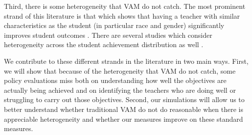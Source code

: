 \documentclass[letterpaper,12pt]{article}
\begin{document}
Third, there is some heterogeneity that VAM do not catch. The most prominent strand of this literature is that which shows that having a teacher with similar characteristics as the student (in particular race and gender) significantly improves student outcomes \citep{dee2005teacher, ehrenberg1995teachers}. There are several studies which consider heterogeneity across the student achievement distribution as well \citep{lockwood2009, condie2014teacher}.

We contribute to these different strands in the literature in two main ways. First, we will show that because of the heterogeneity that VAM do not catch, some policy evaluations miss both on understanding how well the objectives are actually being achieved and on identifying the teachers who are doing well or struggling to carry out those objectives. Second, our simulations will allow us to better understand whether traditional VAM do not do reasonable when there is appreciable heterogeneity and whether our measures improve on these standard measures.






\end{document}

